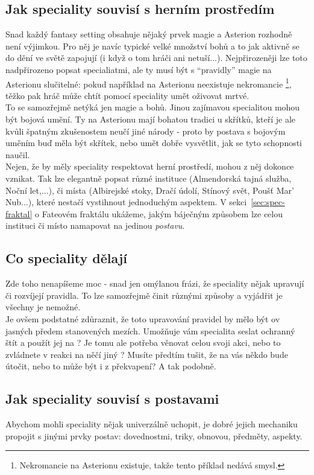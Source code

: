 \documentclass[../main.tex]{subfiles}
\begin{document}
\subsection{Jak speciality souvisí s herním prostředím}
\label{sec:spec-prvky}

Snad každý fantasy setting obsahuje nějaký prvek magie a Asterion rozhodně není výjimkou. Pro něj je navíc typické velké množství bohů a to jak aktivně se do dění ve světě zapojují (i když o tom hráči ani netuší...). Nejpřirozeněji lze toto nadpřirozeno popsat specialiatmi, ale ty musí být s ``pravidly'' magie na Asterionu slučitelné: pokud například na Asterionu neexistuje nekromancie \footnote{Nekromancie na Asterionu existuje, takže tento příklad nedává smysl.}, těžko pak hráč může chtít pomocí speciality umět oživovat mrtvé.\\
To se samozřejmě netýká jen magie a bohů. Jinou zajímavou specialitou mohou být bojová umění. Ty na Asterionu mají bohatou tradici u skřítků, kteří je ale kvůli špatným zkušenostem neučí jiné národy - proto by postava s bojovým uměním buď měla být skřítek, nebo umět dobře vysvětlit, jak se tyto schopnosti naučil.\\
Nejen, že by měly speciality respektovat herní prostředí, mohou z něj dokonce vznikat. Tak lze elegantně popsat různé instituce (Almendorská tajná služba, Noční let,...), či místa (Albirejské stoky, Dračí údolí, Stínový svět, Poušť Mar' Nub...), které nestačí vystihnout jednoduchým aspektem. V sekci~\ref{sec:spec-fraktal} o Fateovém fraktálu ukážeme, jakým báječným způsobem lze celou instituci či místo namapovat na jedinou \textit{postavu}.

\subsection{Co speciality dělají}
\label{sec:spec-delaji}
Zde toho nenapíšeme moc - snad jen omýlanou frázi, že speciality nějak upravují či rozvíjejí pravidla. To lze samozřejmě činit různými způsoby a vyjádřit je všechny je nemožné. \\
Je ovšem podstatné zdůraznit, že toto upravování pravidel by mělo být ov jasných předem stanovených mezích. Umožňuje vám specialita seslat ochranný štít a použít jej na ? Je tomu ale potřeba věnovat celou svoji akci, nebo to zvládnete v reakci na něčí jiný ? Musíte předtím tušit, že na vás někdo bude útočit, nebo to může být i z překvapení? A tak podobně.

\subsection{Jak speciality souvisí s postavami}
\label{sec:spec-postavy}
Abychom mohli speciality nějak univerzálně uchopit, je dobré jejich mechaniku propojit s jinými prvky postav: dovednostmi, triky, obnovou, předměty, aspekty.
\end{document}
